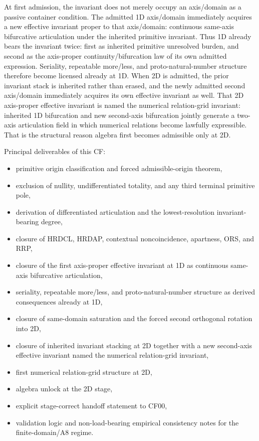 \documentclass[11pt]{article}
\begin{document}
At first admission, the invariant does not merely occupy an axis/domain as a passive container condition. The admitted 1D axis/domain immediately acquires a new effective invariant proper to that axis/domain: continuous same-axis bifurcative articulation under the inherited primitive invariant. Thus 1D already bears the invariant twice: first as inherited primitive unresolved burden, and second as the axis-proper continuity/bifurcation law of its own admitted expression. Seriality, repeatable more/less, and proto-natural-number structure therefore become licensed already at 1D. When 2D is admitted, the prior invariant stack is inherited rather than erased, and the newly admitted second axis/domain immediately acquires its own effective invariant as well. That 2D axis-proper effective invariant is named the numerical relation-grid invariant: inherited 1D bifurcation and new second-axis bifurcation jointly generate a two-axis articulation field in which numerical relations become lawfully expressible. That is the structural reason algebra first becomes admissible only at 2D.

Principal deliverables of this CF:

\begin{itemize}
\item
  primitive origin classification and forced admissible-origin theorem,
\item
  exclusion of nullity, undifferentiated totality, and any third terminal primitive pole,
\item
  derivation of differentiated articulation and the lowest-resolution invariant-bearing degree,
\item
  closure of HRDCL, HRDAP, contextual noncoincidence, apartness, ORS, and RRP,
\item
  closure of the first axis-proper effective invariant at 1D as continuous same-axis bifurcative articulation,
\item
  seriality, repeatable more/less, and proto-natural-number structure as derived consequences already at 1D,
\item
  closure of same-domain saturation and the forced second orthogonal rotation into 2D,
\item
  closure of inherited invariant stacking at 2D together with a new second-axis effective invariant named the numerical relation-grid invariant,
\item
  first numerical relation-grid structure at 2D,
\item
  algebra unlock at the 2D stage,
\item
  explicit stage-correct handoff statement to CF00,
\item
  validation logic and non-load-bearing empirical consistency notes for the finite-domain/A8 regime.
\end{itemize}
\end{document}

